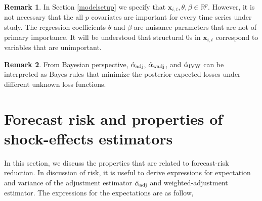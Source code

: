 \documentclass[11pt]{article}
\def\mbf#1{\mathbf{#1}} %
\newcommand{\reals}{\mathbb{R}} %
\theoremstyle{definition}
\newtheorem{remark}{Remark}
\begin{document}
\begin{remark}
In Section \ref{modelsetup} we specify that $\mbf{x}_{i,t}, \theta, \beta \in \reals^p$. 
However, it is not necessary that the all $p$ covariates are important for every time series under study. The regression coefficients $\theta$ and $\beta$ are nuisance parameters that are not of primary importance. 
It will be understood that structural 0s in $\mbf{x}_{i,t}$ correspond to variables that are unimportant. 
\end{remark}

\begin{remark}
  From Bayesian perspective, $\hat{\alpha}_{\rm adj}$, $\hat{\alpha}_{\rm wadj}$, and $\hat{\alpha}_{\rm IVW}$ can be interpreted as Bayes rules that minimize the posterior expected losses under different unknown loss functions.
\end{remark}

\section{Forecast risk and properties of shock-effects estimators}
\label{properties}

In this section, we discuss the properties that are related to forecast-risk reduction. In discussion of risk, it is useful to derive expressions for expectation and variance of the adjustment estimator $\hat{\alpha}_{\rm adj}$ and weighted-adjustment estimator.  The expressions for the expectations are as follow,
\end{document}
